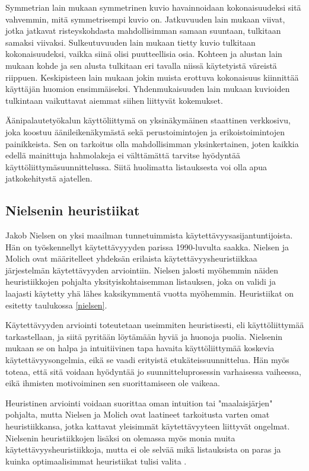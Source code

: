 \documentclass[utf8]{gradu3}
\begin{document}
Symmetrian lain mukaan symmetrinen kuvio havainnoidaan kokonaisuudeksi sitä vahvemmin, mitä symmetrisempi kuvio on. Jatkuvuuden lain mukaan viivat, jotka jatkavat risteyskohdasta mahdollisimman samaan suuntaan, tulkitaan samaksi viivaksi. Sulkeutuvuuden lain mukaan tietty kuvio tulkitaan kokonaisuudeksi, vaikka siinä olisi puutteellisia osia. Kohteen ja alustan lain mukaan kohde ja sen alusta tulkitaan eri tavalla niissä käytetyistä väreistä riippuen. Keskipisteen lain mukaan jokin muista erottuva kokonaisuus kiinnittää käyttäjän huomion ensimmäiseksi. Yhdenmukaisuuden lain mukaan kuvioiden tulkintaan vaikuttavat aiemmat siihen liittyvät kokemukset. 

Äänipalautetyökalun käyttöliittymä on yksinäkymäinen staattinen verkkosivu, joka koostuu  äänileikenäkymästä sekä perustoimintojen ja erikoistoimintojen painikkeista. Sen on tarkoitus olla mahdollisimman yksinkertainen, joten kaikkia edellä mainittuja hahmolakeja ei välttämättä tarvitse hyödyntää käyttöliittymäsuunnittelussa. Siitä huolimatta listauksesta voi olla apua jatkokehitystä ajatellen.

\subsection{Nielsenin heuristiikat}

Jakob Nielsen on yksi maailman tunnetuimmista käytettävyysasijantuntijoista. Hän on työskennellyt käytettävyyyden parissa 1990-luvulta saakka. Nielsen ja Molich \parencite*{improving-human} ovat määritelleet yhdeksän erilaista käytettävyysheuristiikkaa järjestelmän käytettävyyden arviointiin. Nielsen \parencite*{enhancing} jalosti myöhemmin näiden heuristiikkojen pohjalta yksityiskohtaisemman listauksen, joka on validi ja laajasti käytetty yhä lähes kaksikymmentä vuotta myöhemmin. Heuristiikat on esitetty taulukossa \ref{nielsen}.

Käytettävyyden arviointi toteutetaan useimmiten heuristisesti, eli käyttöliittymää tarkastellaan, ja siitä pyritään löytämään hyviä ja huonoja puolia. Nielsenin \parencite*{heuristic-evaluation} mukaan se on halpa ja intuitiivinen tapa havaita käyttöliittymää koskevia käytettävyysongelmia, eikä se vaadi erityistä etukäteissuunnittelua. Hän myös toteaa, että sitä voidaan hyödyntää jo suunnitteluprosessin varhaisessa vaiheessa, eikä ihmisten motivoiminen sen suorittamiseen ole vaikeaa. 

Heuristinen arviointi voidaan suorittaa oman intuition tai "maalaisjärjen" pohjalta, mutta Nielsen ja Molich \parencite*{heuristic-evaluation} ovat laatineet tarkoitusta varten omat heuristiikkansa, jotka kattavat yleisimmät käytettävyyteen liittyvät ongelmat. Nielsenin heuristiikkojen lisäksi on olemassa myös monia muita käytettävyysheuristiikkoja, mutta ei ole selvää mikä listauksista on paras ja kuinka optimaalisimmat heuristiikat tulisi valita \parencite{enhancing}.
\end{document}
